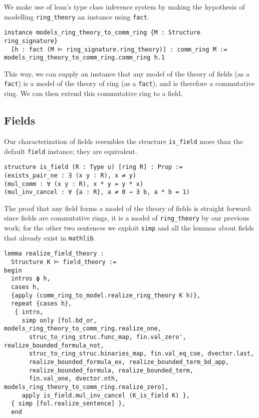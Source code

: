 We make use of lean's type class inference system by making
the hypothesis of modelling \texttt{ring\_theory} an instance
using \texttt{fact}.

\begin{lstlisting}
instance models_ring_theory_to_comm_ring {M : Structure ring_signature}
  [h : fact (M ⊨ ring_signature.ring_theory)] : comm_ring M :=
models_ring_theory_to_comm_ring.comm_ring h.1 \end{lstlisting}

This way, we can supply an instance that any model of the theory of fields
(as a \texttt{fact}) is a model of the theory of ring (as a \texttt{fact}),
and is therefore a commutative ring.
We can then extend this commutative ring to a field.

\subsection{Fields}

Our characterization of fields resembles the structure \texttt{is\_field}
more than the default \texttt{field} instance;
they are equivalent.

\begin{lstlisting}
structure is_field (R : Type u) [ring R] : Prop :=
(exists_pair_ne : ∃ (x y : R), x ≠ y)
(mul_comm : ∀ (x y : R), x * y = y * x)
(mul_inv_cancel : ∀ {a : R}, a ≠ 0 → ∃ b, a * b = 1)\end{lstlisting}

The proof that any field forms a model of the theory of fields is straight forward:
since fields are commutative rings, it is a model of \texttt{ring\_theory}
by our previous work; for the other two sentences we exploit \texttt{simp}
and all the lemmas about fields that already exist in \texttt{mathlib}.

\begin{lstlisting}
lemma realize_field_theory :
  Structure K ⊨ field_theory :=
begin
  intros ϕ h,
  cases h,
  {apply (comm_ring_to_model.realize_ring_theory K h)},
  repeat {cases h},
   { intro,
     simp only [fol.bd_or, models_ring_theory_to_comm_ring.realize_one,
       struc_to_ring_struc.func_map, fin.val_zero', realize_bounded_formula_not,
       struc_to_ring_struc.binaries_map, fin.val_eq_coe, dvector.last,
       realize_bounded_formula_ex, realize_bounded_term_bd_app,
       realize_bounded_formula, realize_bounded_term,
       fin.val_one, dvector.nth, models_ring_theory_to_comm_ring.realize_zero],
     apply is_field.mul_inv_cancel (K_is_field K) },
  { simp [fol.realize_sentence] },
  end\end{lstlisting}

